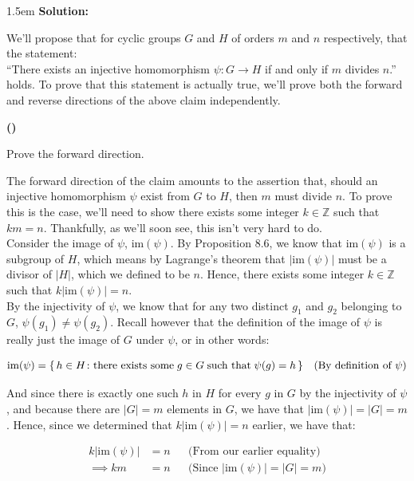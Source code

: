 \documentclass{article}
\newenvironment{solution}{
	\vspace{.5em}
	\par
	\begin{adjustwidth}{1.5em}{}
	\textbf{{Solution:}}
	\par
	\vspace{.5em}
}{
	\vspace{1em}
	\end{adjustwidth}
	\setcounter{step}{0}
	\newpage
}
\newcounter{step}
\renewcommand{\thestep}{\Roman{step}}
\newenvironment{step}{
	\refstepcounter{step}
	\vspace{1em}\par\noindent
	\ignorespaces\noindent\textbf{(\thestep)}
	\ignorespaces
}{
	\par
	\vspace{1.5em}
}
\newcounter{theorem}
\begin{document}
\begin{solution}
	We'll propose that for cyclic groups $G$ and $H$ of orders $m$ and $n$ respectively, that the statement: \\

	``There exists an injective homomorphism $\psi \colon G \rightarrow H$ if and only if $m$ divides $n$.'' \\

	holds. To prove that this statement is actually true, we'll prove both the forward and reverse directions of the above claim independently.

	\begin{step}
		Prove the forward direction.
	\end{step}

	The forward direction of the claim amounts to the assertion that, should an injective homomorphism $\psi$ exist from $G$ to $H$, then $m$ must divide $n$. To prove this is the case, we'll need to show there exists some integer $k \in \mathbb{Z}$ such that $km = n$. Thankfully, as we'll soon see, this isn't very hard to do. \\

	Consider the image of $\psi$, $\text{im}(\psi)$. By Proposition 8.6, we know that $\text{im}(\psi)$ is a subgroup of $H$, which means by Lagrange's theorem that $|\text{im}(\psi)|$ must be a divisor of $|H|$, which we defined to be $n$. Hence, there exists some integer $k \in \mathbb{Z}$ such that $k|\text{im}(\psi)| = n$. \\

	By the injectivity of $\psi$, we know that for any two distinct $g_{1}$ and $g_{2}$ belonging to $G$, $\psi(g_{1}) \neq \psi(g_{2})$. Recall however that the definition of the image of $\psi$ is really just the image of $G$ under $\psi$, or in other words:

	\begin{align*}
		\text{im}(\psi) &= \set{h \in H \colon \text{there exists some} \; g \in G \; \text{such that} \; \psi(g) = h} &&\text{(By definition of $\psi$)} \\
	\end{align*}

	And since there is exactly one such $h$ in $H$ for every $g$ in $G$ by the injectivity of $\psi$, and because there are $|G| = m$ elements in $G$, we have that $|\text{im}(\psi)| = |G| = m$. Hence, since we determined that $k|\text{im}(\psi)| = n$ earlier, we have that:

	\begin{align*}
		k|\text{im}(\psi)| &= n &&\text{(From our earlier equality)} \\
		\implies km &= n &&\text{(Since $|\text{im}(\psi)| = |G| = m$)} \\
	\end{align*}


\end{solution}
\end{document}
